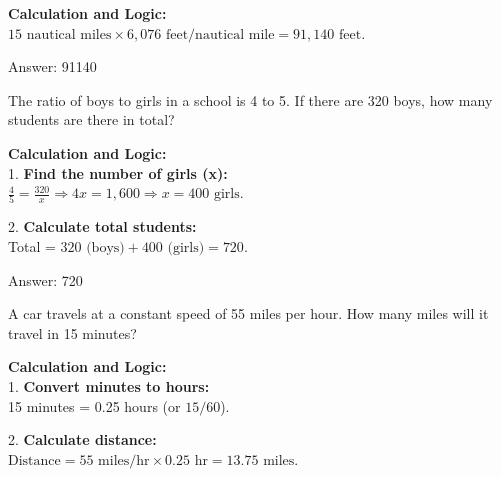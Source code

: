 \documentclass[11pt,paper=a4,answers]{exam}
\begin{document}
\begin{questions}
\begin{solution}
\textbf{Calculation and Logic:} \\
$15 \text{ nautical miles} \times 6,076 \text{ feet/nautical mile} = 91,140 \text{ feet}$.

\vspace{30pt}

Answer: \colorbox{yellow!100}{91140}
\end{solution}

\vspace{60pt}

\question
The ratio of boys to girls in a school is 4 to 5. If there are 320 boys, how many students are there in total?

\begin{solution}
\textbf{Calculation and Logic:} \\
1. \textbf{Find the number of girls (x):} \\
$\frac{4}{5} = \frac{320}{x} \Rightarrow 4x = 1,600 \Rightarrow x = 400 \text{ girls}$.

\vspace{15pt}

2. \textbf{Calculate total students:} \\
Total = $320 \text{ (boys)} + 400 \text{ (girls)} = 720$.

\vspace{30pt}

Answer: \colorbox{yellow!100}{720}
\end{solution}

\vspace{60pt}

\question
A car travels at a constant speed of 55 miles per hour. How many miles will it travel in 15 minutes?

\begin{solution}
\textbf{Calculation and Logic:} \\
1. \textbf{Convert minutes to hours:} \\
15 minutes = 0.25 hours (or $15/60$).

\vspace{15pt}

2. \textbf{Calculate distance:} \\
$\text{Distance} = 55 \text{ miles/hr} \times 0.25 \text{ hr} = 13.75 \text{ miles}$.


\end{solution}
\end{questions}
\end{document}
